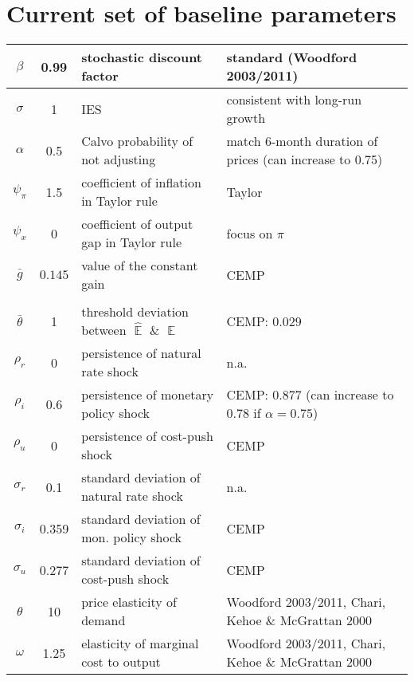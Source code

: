 \documentclass[11pt]{article}
\renewcommand{\[}{\begin{equation}}
\renewcommand{\]}{\end{equation}}
\DeclareMathOperator{\E}{\mathbb{E}}
\begin{document}
\section{Current set of baseline parameters}
\begin{tabular}{ c | c  | l | l}
 $\beta$ & 0.99 & stochastic discount factor & standard (Woodford 2003/2011) \\  \hline
 $\sigma$ & 1  & IES & consistent with long-run growth \\  \hline
 $\alpha$ & 0.5 &  Calvo probability of not adjusting  & match 6-month duration of prices (can increase to 0.75)\\\hline
 $\psi_{\pi} $& 1.5  & coefficient of inflation in Taylor rule & Taylor \\\hline
 $\psi_x$ & 0   & coefficient of output gap in Taylor rule  & focus on $\pi$\\\hline
 $\bar{g}$ & $0.145$  & value of the constant gain & CEMP \\\hline
& & \\ [-1em] %
 $\bar{\theta}$ &  1  & threshold deviation between $\hat{\E}$ \& $\E$ & CEMP: 0.029\\ \hline
    $\rho_r$ & 0 &   persistence of natural rate shock & n.a. \\ \hline
    $\rho_i$ & 0.6 &  persistence of monetary policy shock & CEMP: 0.877  (can increase to 0.78 if $\alpha=0.75$) \\ \hline
    $\rho_u$ & 0  &  persistence of cost-push shock  & CEMP\\ \hline
    $\sigma_r$ & 0.1 & standard deviation of natural rate shock & n.a. \\ \hline
    $\sigma_i$ &  0.359  &standard deviation of mon. policy shock & CEMP \\ \hline
    $\sigma_u$ & 0.277 & standard deviation of cost-push shock & CEMP  \\ \hline
    $\theta$ & 10 & price elasticity of demand &Woodford 2003/2011, Chari, Kehoe \& McGrattan 2000  \\ \hline
    $\omega$ & 1.25 & elasticity of marginal cost to output &Woodford 2003/2011,  Chari, Kehoe \& McGrattan 2000  \\ \hline
\end{tabular}

\newpage
\end{document}
